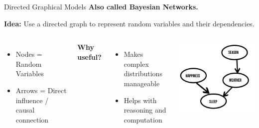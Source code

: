 \documentclass[handout,aspectratio=169]{beamer}
\begin{document}
\begin{frame}{Directed Graphical Models}
  \textbf{Also called Bayesian Networks.}

  \vspace{1em}
  \textbf{Idea:} Use a directed graph to represent random variables and their dependencies.

  \vspace{1em}
  \begin{columns}

  \begin{itemize}
    \item Nodes = Random Variables
    \item Arrows = Direct influence / causal connection
  \end{itemize}

  \vspace{1em}
  \textbf{Why useful?}
  \begin{itemize}
    \item Makes complex distributions manageable
    \item Helps with reasoning and computation
  \end{itemize}
  
    \includegraphics[width=\linewidth]{figs/directed_graph.png}
\end{columns}

\end{frame}
\end{document}
